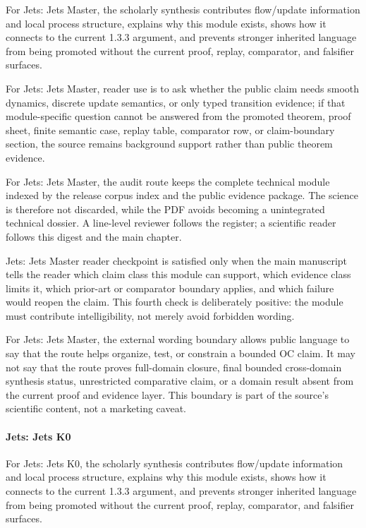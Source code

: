 For Jets: Jets Master, the scholarly synthesis contributes flow/update information and local process structure, explains why this module exists, shows how it connects to the current 1.3.3 argument, and prevents stronger inherited language from being promoted without the current proof, replay, comparator, and falsifier surfaces.


For Jets: Jets Master, reader use is to ask whether the public claim needs smooth dynamics, discrete update semantics, or only typed transition evidence; if that module-specific question cannot be answered from the promoted theorem, proof sheet, finite semantic case, replay table, comparator row, or claim-boundary section, the source remains background support rather than public theorem evidence.


For Jets: Jets Master, the audit route keeps the complete technical module indexed by the release corpus index and the public evidence package. The science is therefore not discarded, while the PDF avoids becoming a unintegrated technical dossier. A line-level reviewer follows the register; a scientific reader follows this digest and the main chapter.


Jets: Jets Master reader checkpoint is satisfied only when the main manuscript tells the reader which claim class this module can support, which evidence class limits it, which prior-art or comparator boundary applies, and which failure would reopen the claim. This fourth check is deliberately positive: the module must contribute intelligibility, not merely avoid forbidden wording.


For Jets: Jets Master, the external wording boundary allows public language to say that the route helps organize, test, or constrain a bounded OC claim. It may not say that the route proves full-domain closure, final bounded cross-domain synthesis status, unrestricted comparative claim, or a domain result absent from the current proof and evidence layer. This boundary is part of the source's scientific content, not a marketing caveat.


\paragraph{Jets: Jets K0}

For Jets: Jets K0, the scholarly synthesis contributes flow/update information and local process structure, explains why this module exists, shows how it connects to the current 1.3.3 argument, and prevents stronger inherited language from being promoted without the current proof, replay, comparator, and falsifier surfaces.


